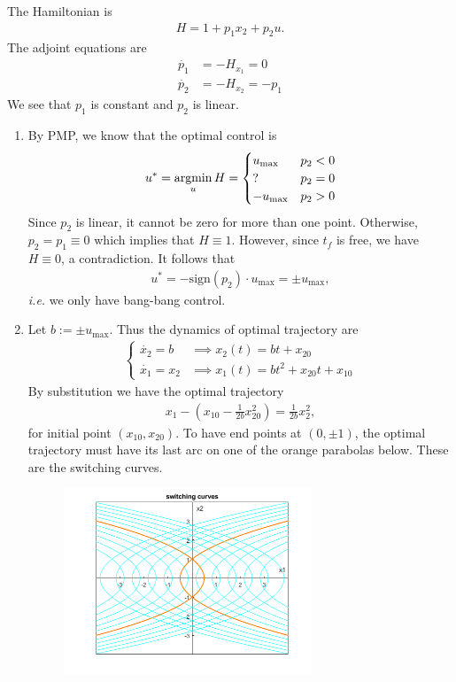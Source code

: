 \documentclass[12pt]{article}
\begin{document}
\begin{problem}[3]
The Hamiltonian is
\begin{align*}
	H = 1 + p_1 x_2 + p_2 u .
\end{align*}
The adjoint equations are
\begin{align*}
	\dot{p_1} &= -H_{x_1} = 0 \\
	\dot{p_2} &= -H_{x_2} = - p_1 
\end{align*}
We see that $ p_1$ is constant and $ p_2$ is linear.
\begin{enumerate}[label=(\alph*)]
\item By PMP, we know that the optimal control is
\begin{align*}
	u^*  = \operatorname*{argmin}_u H = \begin{cases}
		u_{\max} & p_2 < 0\\
		? & p_2 =0\\
		-u_{\max} & p_2 >0
	\end{cases}
\end{align*}
Since $ p_2$ is linear, it cannot be zero for more than one point. Otherwise, $ p_2 = p_1 \equiv 0$ which implies that $ H \equiv 1$. However, since $ t_f$ is free, we have  $ H \equiv 0$, a contradiction. It follows that
 \begin{align*}
	u^* = - \text{sign}(p_2) \cdot u_{\max} = \pm u_{ \max},  
\end{align*}
\emph{i.e.} we only have bang-bang control.
\item Let $ b := \pm u_{\max}$. Thus the dynamics of optimal trajectory are
	\begin{align*}
		\begin{cases}
			\dot{x_2} = b &\implies x_2(t) = bt+x_{20}\\
			\dot{x_1} = x_2 &\implies x_1(t) = bt^2 + x_{20}t+x_{10}
		\end{cases}
	\end{align*}
By substitution we have the optimal trajectory
\begin{align*}
	x_1-\left( x_{10} -\frac{1}{2b} x_{20}^2\right)  = \frac{1}{2b} x_2^2 ,
\end{align*}
for initial point $ (x_{10},x_{20})$. To have end points at $ (0,\pm 1)$, the optimal trajectory must have its last arc on one of the orange parabolas below. These are the switching curves.
~\begin{figure}[H]
	\centering
	\includegraphics[width=0.7\textwidth]{./figures/6.9.png}

\end{figure}
\end{enumerate}
\end{problem}
\end{document}
